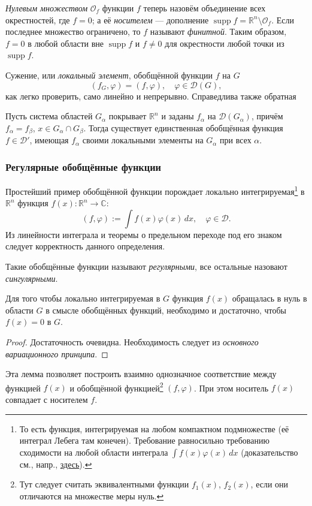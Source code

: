 \emph{Нулевым множеством} $ \mathcal O_f $ функции $ f $ теперь назовём объединение всех окрестностей, где $ f
= 0$; а её \emph{носителем} --- дополнение $ \operatorname{supp} f = \mathbb R^n
\setminus\mathcal O_f$. Если последнее множество ограничено, то $ f $ называют
\emph{финитной}. Таким образом, $ f = 0 $ в любой области вне $ \operatorname{supp} f $
и $ f\neq 0 $ для окрестности любой точки из $ \operatorname{supp}f $.

Сужение, или \emph{локальный элемент}, обобщённой функции $ f $ на $ G $  
\[
  (f_G, \varphi) = (f, \varphi), \quad \varphi \in\mathcal D(G),
\]
как легко проверить, само линейно и непрерывно. Справедлива также обратная
\begin{theorem}
  Пусть система областей $ G_\alpha $ покрывает $ \mathbb R^n $ и заданы $
  f_\alpha $ на $ \mathcal D(G_\alpha) $, причём $ f_\alpha = f_\beta $, $ x \in
  G_\alpha \cap G_\beta$. Тогда существует единственная обобщённая функция $ f
  \in\mathcal D' $, имеющая $ f_\alpha $ своими локальными элементы на $
  G_\alpha $ при всех $ \alpha $.
\end{theorem}

\subsubsection{Регулярные обобщённые функции}
Простейший пример обобщённой функции порождает локально
интегрируемая\footnote{То есть функция, интегрируемая на
любом компактном подмножестве (её интеграл Лебега там конечен). Требование
равносильно требованию сходимости на любой области интеграла $ \int f(x)\varphi(x)\,dx $
(доказательство см., напр.,
\href{https://en.wikipedia.org/wiki/Locally_integrable_function}{здесь}).} в $ \mathbb R^n
$ функция $ f(x)\colon \mathbb R^n \to \mathbb C $: 
\[
  (f,\varphi) := \int f(x)\varphi(x)\,dx, \quad \varphi \in \mathcal D.
\]
Из линейности интеграла и теоремы о предельном переходе под его знаком следует
корректность данного определения.

Такие обобщённые функции называют \emph{регулярными}, все остальные назовают
\emph{сингулярными}.

\begin{theorem}
  Для того чтобы локально интегрируемая в $ G $ функция $ f(x) $ обращалась в
  нуль в области $ G $ в смысле обобщённых функций, необходимо и достаточно,
  чтобы $ f(x) = 0 $ в $ G $.
\end{theorem}
\begin{proof} Достаточность очевидна. Необходимость следует из \emph{основного
  вариационного принципа}.
\end{proof}
Эта лемма позволяет построить взаимно однозначное соответствие между функцией $
f(x)$ и обобщённой функцией\footnote{Тут следует считать эквивалентными функции
$ f_1(x) $, $ f_2(x) $, если они отличаются на множестве меры нуль.} $ (f, \varphi) $. При этом носитель $ f(x) $
совпадает с носителем $ f $.

